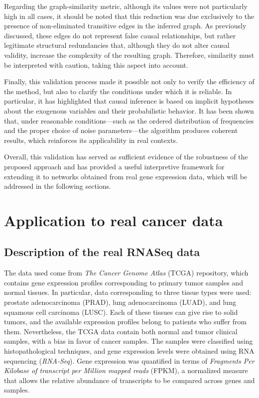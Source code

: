 \documentclass[12pt,a4paper]{report}
\begin{document}
Regarding the graph-similarity metric, although its values were not particularly high in all cases, it should be noted that this reduction was due exclusively to the presence of non-eliminated transitive edges in the inferred graph. As previously discussed, these edges do not represent false causal relationships, but rather legitimate structural redundancies that, although they do not alter causal validity, increase the complexity of the resulting graph. Therefore, similarity must be interpreted with caution, taking this aspect into account.

Finally, this validation process made it possible not only to verify the efficiency of the method, but also to clarify the conditions under which it is reliable. In particular, it has highlighted that causal inference is based on implicit hypotheses about the exogenous variables and their probabilistic behavior. It has been shown that, under reasonable conditions---such as the ordered distribution of frequencies and the proper choice of noise parameters---the algorithm produces coherent results, which reinforces its applicability in real contexts.

Overall, this validation has served as sufficient evidence of the robustness of the proposed approach and has provided a useful interpretive framework for extending it to networks obtained from real gene expression data, which will be addressed in the following sections.



\section{Application to real cancer data}
\label{sec:3.3}


\subsection{Description of the real RNASeq data}

The data used come from \textit{The Cancer Genome Atlas} (TCGA) repository, which contains gene expression profiles corresponding to primary tumor samples and normal tissues. In particular, data corresponding to three tissue types were used: prostate adenocarcinoma (PRAD), lung adenocarcinoma (LUAD), and lung squamous cell carcinoma (LUSC). Each of these tissues can give rise to solid tumors, and the available expression profiles belong to patients who suffer from them. Nevertheless, the TCGA data contain both normal and tumor clinical samples, with a bias in favor of cancer samples. The samples were classified using histopathological techniques, and gene expression levels were obtained using RNA sequencing (\textit{RNA-Seq}). Gene expression was quantified in terms of \textit{Fragments Per Kilobase of transcript per Million mapped reads} (FPKM), a normalized measure that allows the relative abundance of transcripts to be compared across genes and samples\cite{biomarkers}.
\end{document}
